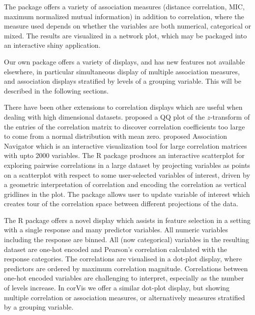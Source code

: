 The package  \citep{linkspotter} offers a variety
of association measures (distance correlation, MIC, maximum normalized
mutual information) in addition to correlation, where the measure used
depends on whether the variables are both numerical, categorical or
mixed. The results are visualized in a network plot, which may be
packaged into an interactive shiny application.

Our own package  offers a variety of displays, and has
new features not available elsewhere, in particular simultaneous display
of multiple association measures, and association displays stratified by
levels of a grouping variable. This will be described in the following
sections.

There have been other extensions to correlation displays which are
useful when dealing with high dimensional datasets.
\citet{hills1969looking} proposed a QQ plot of the \(z\)-transform of
the entries of the correlation matrix to discover correlation
coefficients too large to come from a normal distribution with mean
zero. \citet{buja2016visualization} proposed Association Navigator which
is an interactive visualization tool for large correlation matrices with
upto 2000 variables. The R package  \citep{scorr}
produces an interactive scatterplot for exploring pairwise correlations
in a large dataset by projecting variables as points on a scatterplot
with respect to some user-selected variables of interest, driven by a
geometric interpretation of correlation and encoding the correlation as
vertical gridlines in the plot. The package allows user to update
variable of interest which creates tour of the correlation space between
different projections of the data.

The R package  offers a novel display which
assists in feature selection in a setting with a single response and
many predictor variables. All numeric variables including the response
are binned. All (now categorical) variables in the resulting dataset are
one-hot encoded and Pearson's correlation calculated with the response
categories. The correlations are visualised in a dot-plot display, where
predictors are ordered by maximum correlation magnitude. Correlations
between one-hot encoded variables are challenging to interpret,
especially as the number of levels increase. In corVis we offer a
similar dot-plot display, but showing multiple correlation or
association measures, or alternatively measures stratified by a grouping
variable.

